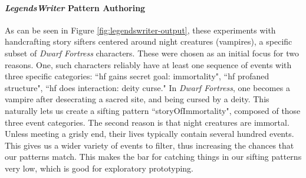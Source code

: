 \paragraph{\textit{LegendsWriter} Pattern Authoring}\label{par:legendswriter-pattern-authoring}

As can be seen in Figure \ref{fig:legendswriter-output}, these experiments with handcrafting story sifters centered around night creatures (vampires), a specific subset of \textit{Dwarf Fortress} characters. These were chosen as an initial focus for two reasons. One, such characters reliably have at least one sequence of events with three specific categories: ``hf gains secret goal: immortality", ``hf profaned structure", ``hf does interaction: deity curse." In \textit{Dwarf Fortress}, one becomes a vampire after desecrating a sacred site, and being cursed by a deity. This naturally lets us create a sifting pattern ``storyOfImmortality", composed of those three event categories. The second reason is that night creatures are immortal. Unless meeting a grisly end, their lives typically contain several hundred events. This gives us a wider variety of events to filter, thus increasing the chances that our patterns match. This makes the bar for catching things in our sifting patterns very low, which is good for exploratory prototyping.

